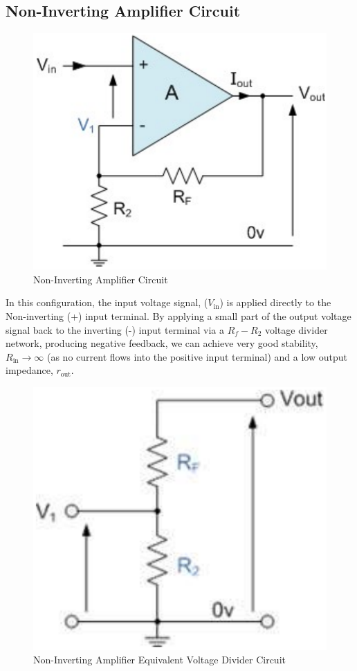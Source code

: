 
\subsection{Non-Inverting Amplifier Circuit}

\begin{figure}[H]
    \centering
    \includegraphics[width=0.6\columnwidth]{images/noninv1.png}
    \caption{Non-Inverting Amplifier Circuit}
    \label{noninv1}
\end{figure}

In this configuration, the input voltage signal, ($V_\text{in}$) is applied directly to the Non-inverting (+) input terminal. By applying a small part of the output voltage signal back to the inverting (-) input terminal via a $R_f - R_2$ voltage divider network, producing negative feedback, we can achieve very good stability, $R_\text{in} \rightarrow \infty$ (as no current flows into the positive input terminal) and a low output impedance, $r_\text{out}$.

\begin{figure}[H]
    \centering
    \includegraphics[width=0.45\columnwidth]{images/noninv2.png}
    \caption{Non-Inverting Amplifier Equivalent Voltage Divider Circuit}
    \label{noninv2}
\end{figure}

